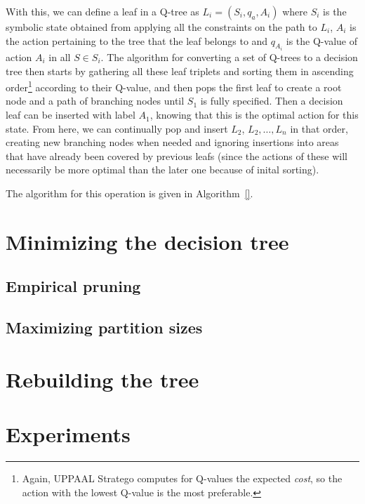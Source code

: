 \documentclass{article}
\begin{document}
With this, we can define a leaf in a Q-tree as $L_i = (S_i, q_a, A_i)$ where
$S_i$ is the symbolic state obtained from applying all the constraints on the
path to $L_i$, $A_i$ is the action pertaining to the tree that the leaf belongs
to and $q_{A_i}$ is the Q-value of action $A_i$ in all $S \in S_i$. The
algorithm for converting a set of Q-trees to a decision tree then starts by
gathering all these leaf triplets and sorting them in ascending order\footnote{%
    Again, UPPAAL Stratego computes for Q-values the expected \textit{cost}, so
the action with the lowest Q-value is the most preferable.} according to their
Q-value, and then pops the first leaf to create a root node and a path of
branching nodes until $S_1$ is fully specified. Then a decision leaf can be
inserted with label $A_1$, knowing that this is the optimal action for this
state. From here, we can continually pop and insert $L_2$, $L_2, \ldots, L_n$ in
that order, creating new branching nodes when needed and ignoring insertions
into areas that have already been covered by previous leafs (since the actions
of these will necessarily be more optimal than the later one because of inital
sorting).

The algorithm for this operation is given in Algorithm~\ref{}.


\section{Minimizing the decision tree}%
\label{sec:minimizingDT}

\lipsum[1]

\subsection{Empirical pruning}%
\label{subsec:empPruning}

\lipsum[2]

\subsection{Maximizing partition sizes}%
\label{subsec:findBoxes}

\lipsum[3]


\section{Rebuilding the tree}%
\label{sec:rebuildTree}

\lipsum[5]


\section{Experiments}%
\label{sec:experiments}
\end{document}
